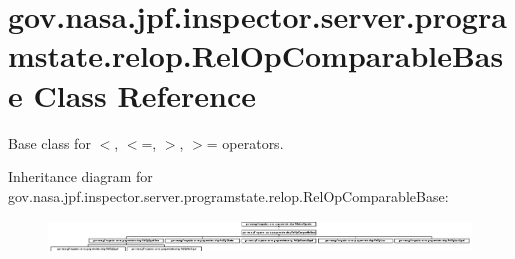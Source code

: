 \hypertarget{classgov_1_1nasa_1_1jpf_1_1inspector_1_1server_1_1programstate_1_1relop_1_1_rel_op_comparable_base}{}\section{gov.\+nasa.\+jpf.\+inspector.\+server.\+programstate.\+relop.\+Rel\+Op\+Comparable\+Base Class Reference}
\label{classgov_1_1nasa_1_1jpf_1_1inspector_1_1server_1_1programstate_1_1relop_1_1_rel_op_comparable_base}


Base class for $<$, $<$=, $>$, $>$= operators.  


Inheritance diagram for gov.\+nasa.\+jpf.\+inspector.\+server.\+programstate.\+relop.\+Rel\+Op\+Comparable\+Base\+:\begin{figure}[H]
\begin{center}
\leavevmode
\includegraphics[height=0.864197cm]{classgov_1_1nasa_1_1jpf_1_1inspector_1_1server_1_1programstate_1_1relop_1_1_rel_op_comparable_base}
\end{center}
\end{figure}
